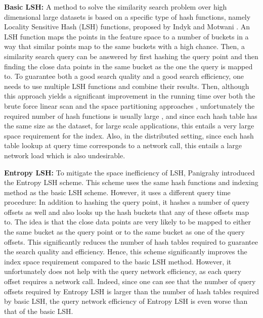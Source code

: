 \documentclass{acm_proc_article-sp}
\numberwithin{equation}{section}
\numberwithin{figure}{section}
\begin{document}
\noindent \textbf{Basic LSH:} A method to solve the similarity search problem over high dimensional large datasets is based on a specific type of hash functions, namely Locality Sensitive Hash (LSH) functions, proposed by Indyk and Motwani \cite{im98}. An LSH function maps the points in the feature space to a number of buckets in a way that similar points map to the same buckets with a high chance. Then, a similarity search query can be answered by first hashing the query point and then finding the close data points in the same bucket as the one the query is mapped to. To guarantee both a good search quality and a good search efficiency, one needs to use multiple LSH functions and combine their results. Then, although this approach yields a significant improvement in the running time over both the brute force linear scan and the space partitioning approaches \cite{gim99, Bentley:kdtree, Kakade:covertrees, Krauthgamer:lee:navigating:nets, Rtrees, SRtrees}, unfortunately the required number of hash functions is usually large \cite{Buhler, gim99}, and since each hash table has the same size as the dataset, for large scale applications, this entails a very large space requirement for the index. Also, in the distributed setting, since each hash table lookup at query time corresponds to a network call, this entails a large network load which is also undesirable.

\noindent \textbf{Entropy LSH:} To mitigate the space inefficiency of LSH, Panigrahy \cite{P06} introduced the Entropy LSH scheme. This scheme uses the same hash functions and indexing method as the basic LSH scheme. However, it uses a different query time procedure: In addition to hashing the query point, it hashes a number of query offsets as well and also looks up the hash buckets that any of these offsets map to. The idea is that the close data points are very likely to be mapped to either the same bucket as the query point or to the same bucket as one of the query offsets. This significantly reduces the number of hash tables required to guarantee the search quality and efficiency. Hence, this scheme significantly improves the index space requirement compared to the basic LSH method. However, it unfortunately does not help with the query network efficiency, as each query offset requires a network call. Indeed, since one can see that \cite{im98, P06, Charikar:multiprobe} the number of query offsets required by Entropy LSH is larger than the number of hash tables required by basic LSH, the query network efficiency of Entropy LSH is even worse than that of the basic LSH.
\end{document}
